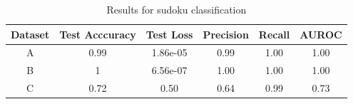 \documentclass[twoside]{article}
\begin{document}
\begin{table}[h!]
  \begin{center}
    \caption{Results for sudoku classification}
    \label{tab:table1}
    \begin{tabular}{c|c|c|c|c|c}
      \textbf{Dataset} & \textbf{Test Acccuracy} & \textbf{Test Loss} &  \textbf{Precision} &  \textbf{Recall} &  \textbf{AUROC} \\ 
      \hline
      A & 0.99 & 1.86e-05 & 0.99 & 1.00 & 1.00\\
      B & 1 & 6.56e-07& 1.00 & 1.00 & 1.00\\
      C & 0.72 & 0.50 & 0.64 & 0.99 & 0.73 \\
      \hline
    \end{tabular}
  \end{center}
\end{table}
\end{document}
